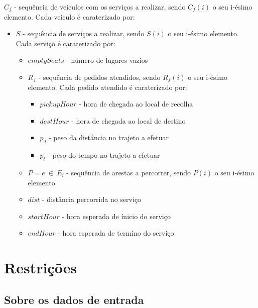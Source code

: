 \documentclass[article, a4paper, 12pt, oneside]{memoir}
\begin{document}
$C_f$ - sequência de veículos com os serviços a realizar, sendo $C_f(i)$ o seu i-ésimo elemento. Cada veículo é caraterizado por:
\begin{itemize}
	\item $S$ - sequência de serviços a realizar, sendo $S(i)$ o seu i-ésimo elemento. Cada serviço é caraterizado por:
	\begin{itemize}
		\item $emptySeats$ - número de lugares vazios
		\item $R_f$ - sequência de pedidos atendidos, sendo $R_f(i)$ o seu i-ésimo elemento. Cada pedido atendido é caraterizado por:
		\begin{itemize}
			\item $pickupHour$ - hora de chegada ao local de recolha
			\item $destHour$ - hora de chegada ao local de destino
			\item $p_d$ - peso da distância no trajeto a efetuar
			\item $p_t$ - peso do tempo no trajeto a efetuar
		\end{itemize}
		\item $P = { e ~ \in ~ E_i }$ - sequência de arestas a percorrer, sendo $P(i)$ o seu i-ésimo elemento
		\item $dist$ - distância percorrida no serviço
		\item $startHour$ - hora esperada de ínicio do serviço
		\item $endHour$ - hora esperada de termino do serviço
	\end{itemize}
\end{itemize}

\newpage
\section{Restrições}

\subsection{Sobre os dados de entrada}
\end{document}
